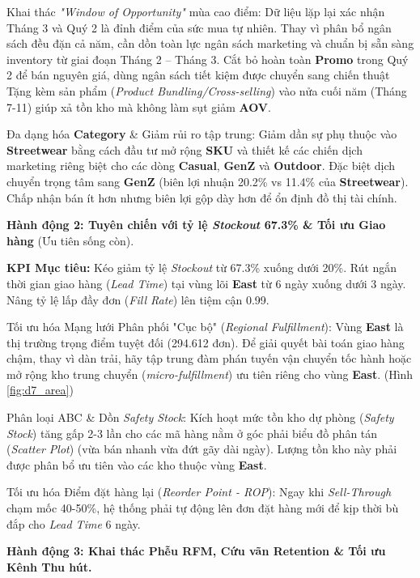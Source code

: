 \documentclass{article}
\begin{document}
Khai thác \textit{"Window of Opportunity"} mùa cao điểm: Dữ liệu lặp lại xác nhận Tháng 3 và Quý 2 là đỉnh điểm của sức mua tự nhiên. Thay vì phân bổ ngân sách đều đặn cả năm, cần dồn toàn lực ngân sách marketing và chuẩn bị sẵn sàng inventory từ giai đoạn Tháng 2 – Tháng 3. Cắt bỏ hoàn toàn \textbf{Promo} trong Quý 2 để bán nguyên giá, dùng ngân sách tiết kiệm được chuyển sang chiến thuật Tặng kèm sản phẩm (\textit{Product Bundling/Cross-selling}) vào nửa cuối năm (Tháng 7-11) giúp xả tồn kho mà không làm sụt giảm \textbf{AOV}.

Đa dạng hóa \textbf{Category} \& Giảm rủi ro tập trung: Giảm dần sự phụ thuộc vào \textbf{Streetwear} bằng cách đầu tư mở rộng \textbf{SKU} và thiết kế các chiến dịch marketing riêng biệt cho các dòng \textbf{Casual}, \textbf{GenZ} và \textbf{Outdoor}. Đặc biệt dịch chuyển trọng tâm sang \textbf{GenZ} (biên lợi nhuận 20.2\% vs 11.4\% của \textbf{Streetwear}). Chấp nhận bán ít hơn nhưng biên lợi gộp dày hơn để ổn định đồ thị tài chính.

\textbf{Hành động 2: Tuyên chiến với tỷ lệ \textit{Stockout} 67.3\% \& Tối ưu Giao hàng} (Ưu tiên sống còn).

\textbf{KPI Mục tiêu:} Kéo giảm tỷ lệ \textit{Stockout} từ 67.3\% xuống dưới 20\%. Rút ngắn thời gian giao hàng (\textit{Lead Time}) tại vùng lõi \textbf{East} từ 6 ngày xuống dưới 3 ngày. Nâng tỷ lệ lấp đầy đơn (\textit{Fill Rate}) lên tiệm cận 0.99.

Tối ưu hóa Mạng lưới Phân phối "Cục bộ" (\textit{Regional Fulfillment}): Vùng \textbf{East} là thị trường trọng điểm tuyệt đối (294.612 đơn). Để giải quyết bài toán giao hàng chậm, thay vì dàn trải, hãy tập trung đàm phán tuyến vận chuyển tốc hành hoặc mở rộng kho trung chuyển (\textit{micro-fulfillment}) ưu tiên riêng cho vùng \textbf{East}. (Hình \ref{fig:d7_area})

Phân loại ABC \& Dồn \textit{Safety Stock}: Kích hoạt mức tồn kho dự phòng (\textit{Safety Stock}) tăng gấp 2-3 lần cho các mã hàng nằm ở góc phải biểu đồ phân tán (\textit{Scatter Plot}) (vừa bán nhanh vừa đứt gãy dài ngày). Lượng tồn kho này phải được phân bổ ưu tiên vào các kho thuộc vùng \textbf{East}.

Tối ưu hóa Điểm đặt hàng lại (\textit{Reorder Point - ROP}): Ngay khi \textit{Sell-Through} chạm mốc 40-50\%, hệ thống phải tự động lên đơn đặt hàng mới để kịp thời bù đắp cho \textit{Lead Time} 6 ngày.

\textbf{Hành động 3: Khai thác Phễu \textbf{RFM}, Cứu vãn \textbf{Retention} \& Tối ưu Kênh Thu hút.}
\end{document}
